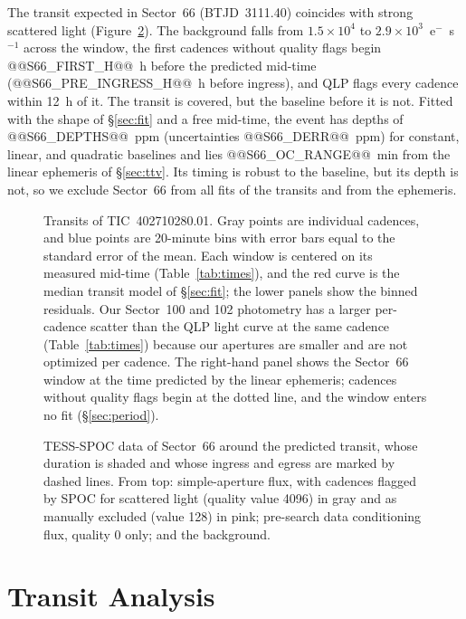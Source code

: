 \documentclass[twocolumn,linenumbers]{aastex701}
\newcommand{\planet}{TIC~402710280.01}
\begin{document}
The transit expected in Sector~66 (BTJD~3111.40) coincides with strong scattered light (Figure~\ref{fig:s66}). The background falls from $1.5 \times 10^4$ to $2.9 \times 10^3$~e$^-$~s$^{-1}$ across the window, the first cadences without quality flags begin @@S66_FIRST_H@@~h before the predicted mid-time (@@S66_PRE_INGRESS_H@@~h before ingress), and QLP flags every cadence within 12~h of it. The transit is covered, but the baseline before it is not. Fitted with the shape of \S\ref{sec:fit} and a free mid-time, the event has depths of @@S66_DEPTHS@@~ppm (uncertainties @@S66_DERR@@~ppm) for constant, linear, and quadratic baselines and lies @@S66_OC_RANGE@@~min from the linear ephemeris of \S\ref{sec:ttv}. Its timing is robust to the baseline, but its depth is not, so we exclude Sector~66 from all fits of the transits and from the ephemeris.

\begin{figure}
\caption{Transits of \planet. Gray points are individual cadences, and blue points are 20-minute bins with error bars equal to the standard error of the mean. Each window is centered on its measured mid-time (Table~\ref{tab:times}), and the red curve is the median transit model of \S\ref{sec:fit}; the lower panels show the binned residuals. Our Sector~100 and 102 photometry has a larger per-cadence scatter than the QLP light curve at the same cadence (Table~\ref{tab:times}) because our apertures are smaller and are not optimized per cadence. The right-hand panel shows the Sector~66 window at the time predicted by the linear ephemeris; cadences without quality flags begin at the dotted line, and the window enters no fit (\S\ref{sec:period}).\label{fig:transits}}
\end{figure}

\begin{figure}
\caption{TESS-SPOC data of Sector~66 around the predicted transit, whose duration is shaded and whose ingress and egress are marked by dashed lines. From top: simple-aperture flux, with cadences flagged by SPOC for scattered light (quality value 4096) in gray and as manually excluded (value 128) in pink; pre-search data conditioning flux, quality 0 only; and the background.\label{fig:s66}}
\end{figure}

\section{Transit Analysis} \label{sec:analysis}
\end{document}
